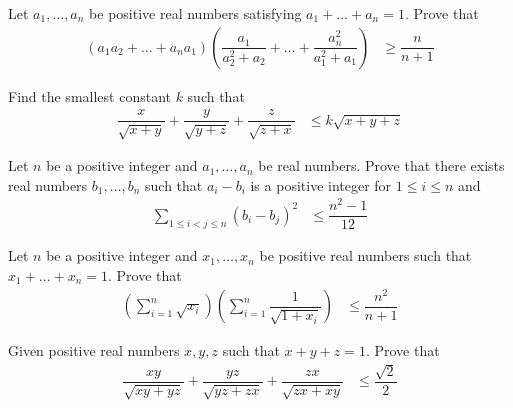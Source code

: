 \documentclass{subfile}
\begin{document}
		\begin{problem}
			Let $a_{1},\ldots,a_{n}$ be positive real numbers satisfying $a_{1}+\ldots+a_{n}=1$. Prove that
				\begin{align*}
					(a_{1}a_{2}+\ldots+a_{n}a_{1})\left(\dfrac{a_{1}}{a_{2}^{2}+a_{2}}+\ldots+\dfrac{a_{n}^{2}}{a_{1}^{2}+a_{1}}\right)
						& \geq \dfrac{n}{n+1}
				\end{align*}
		\end{problem}
	
		\begin{problem}
			Find the smallest constant $k$ such that
				\begin{align*}
					\dfrac{x}{\sqrt{x+y}}+\dfrac{y}{\sqrt{y+z}}+\dfrac{z}{\sqrt{z+x}}
						& \leq k\sqrt{x+y+z}
				\end{align*}
		\end{problem}
	
		\begin{problem}
			Let $n$ be a positive integer and $a_{1},\ldots,a_{n}$ be real numbers. Prove that there exists real numbers $b_{1},\ldots,b_{n}$ such that $a_{i}-b_{i}$ is a positive integer for $1\leq i\leq n$ and
				\begin{align*}
					\sum_{1\leq i<j\leq n}(b_{i}-b_{j})^{2}
						& \leq \dfrac{n^{2}-1}{12}
				\end{align*}
		\end{problem}
	
		\begin{problem}
			Let $n$ be a positive integer and $x_{1},\ldots,x_{n}$ be positive real numbers such that $x_{1}+\ldots+x_{n}=1$. Prove that
				\begin{align*}
					\left(\sum_{i=1}^{n}\sqrt{x_{i}}\right)\left(\sum_{i=1}^{n}\dfrac{1}{\sqrt{1+x_{i}}}\right)
						& \leq\dfrac{n^{2}}{n+1}
				\end{align*}
		\end{problem}
	
		\begin{problem}
			Given positive real numbers $x,y,z$ such that $x+y+z=1$. Prove that
				\begin{align*}
					\dfrac{xy}{\sqrt{xy+yz}}+\dfrac{yz}{\sqrt{yz+zx}}+\dfrac{zx}{\sqrt{zx+xy}}
						& \leq\dfrac{\sqrt{2}}{2}
				\end{align*}
		\end{problem}
	
\end{document}

